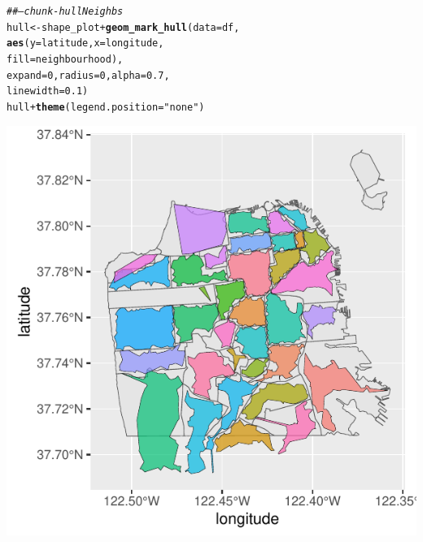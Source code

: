 \documentclass[a4paper, justified]{tufte-handout}\usepackage[]{graphicx}\usepackage[]{xcolor}
\makeatletter
\def\maxwidth{ %
  \ifdim\Gin@nat@width>\linewidth
    \linewidth
  \else
    \Gin@nat@width
  \fi
}
\newcommand{\hlnum}[1]{\textcolor[rgb]{0.686,0.059,0.569}{#1}}%
\newcommand{\hlstr}[1]{\textcolor[rgb]{0.192,0.494,0.8}{#1}}%
\newcommand{\hlcom}[1]{\textcolor[rgb]{0.678,0.584,0.686}{\textit{#1}}}%
\newcommand{\hlopt}[1]{\textcolor[rgb]{0,0,0}{#1}}%
\newcommand{\hlstd}[1]{\textcolor[rgb]{0.345,0.345,0.345}{#1}}%
\newcommand{\hlkwb}[1]{\textcolor[rgb]{0.69,0.353,0.396}{#1}}%
\newcommand{\hlkwc}[1]{\textcolor[rgb]{0.333,0.667,0.333}{#1}}%
\newcommand{\hlkwd}[1]{\textcolor[rgb]{0.737,0.353,0.396}{\textbf{#1}}}%
\newenvironment{kframe}{%
 \def\at@end@of@kframe{}%
 \ifinner\ifhmode%
  \def\at@end@of@kframe{\end{minipage}}%
  \begin{minipage}{\columnwidth}%
 \fi\fi%
 \def\FrameCommand##1{\hskip\@totalleftmargin \hskip-\fboxsep
 \colorbox{shadecolor}{##1}\hskip-\fboxsep
     \hskip-\linewidth \hskip-\@totalleftmargin \hskip\columnwidth}%
 \MakeFramed {\advance\hsize-\width
   \@totalleftmargin\z@ \linewidth\hsize
   \@setminipage}}%
 {\par\unskip\endMakeFramed%
 \at@end@of@kframe}
\newenvironment{knitrout}{}{} %
\makeatother
\begin{document}
\begin{knitrout}
\begin{kframe}\begin{alltt}
\hlcom{## -- chunk-hullNeighbs}
\hlstd{hull} \hlkwb{<-} \hlstd{shape_plot} \hlopt{+} \hlkwd{geom_mark_hull}\hlstd{(}\hlkwc{data} \hlstd{= df,}
    \hlkwd{aes}\hlstd{(}\hlkwc{y} \hlstd{= latitude,} \hlkwc{x} \hlstd{= longitude,}
        \hlkwc{fill} \hlstd{= neighbourhood),}
    \hlkwc{expand} \hlstd{=} \hlnum{0}\hlstd{,} \hlkwc{radius} \hlstd{=} \hlnum{0}\hlstd{,} \hlkwc{alpha} \hlstd{=} \hlnum{0.7}\hlstd{,}
    \hlkwc{linewidth} \hlstd{=} \hlnum{0.1}\hlstd{)}
\hlstd{hull} \hlopt{+} \hlkwd{theme}\hlstd{(}\hlkwc{legend.position} \hlstd{=} \hlstr{"none"}\hlstd{)}
\end{alltt}
\end{kframe}\begin{marginfigure}
\includegraphics[width=\maxwidth]{figure/chunk-plotNeighbs-2} \end{marginfigure}

\end{knitrout}




\end{document}

